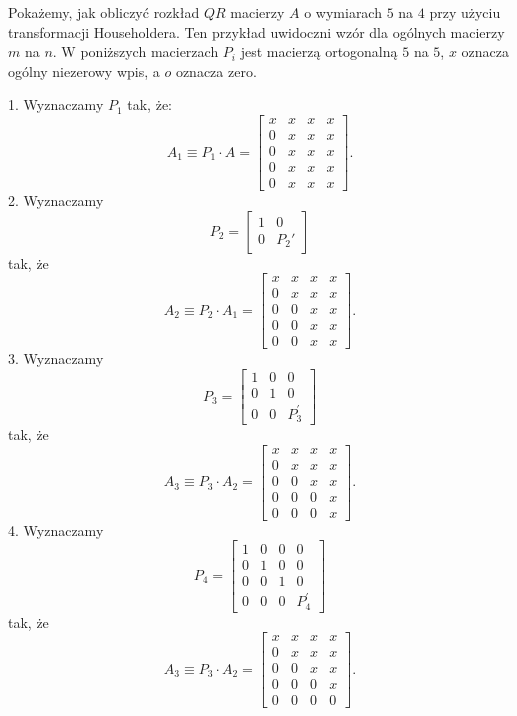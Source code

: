 \documentclass[12pt,a4paper]{report}
\newcommand{\mx}[1]{{#1}}
\begin{document}
\begin{example} Pokażemy, jak obliczyć rozkład $QR$ macierzy $A$ o wymiarach $5$ na $4$ przy użyciu transformacji Householdera. Ten przykład uwidoczni wzór dla ogólnych macierzy $m$ na $n$. W poniższych macierzach $P_{i}$ jest macierzą ortogonalną $5$ na $5$, $x$ oznacza ogólny niezerowy wpis, a $o$ oznacza zero.

1. Wyznaczamy $P_{1}$ tak, że:
$$
\mx{A_{1} \equiv {P_{1}\cdot A}}= \begin{bmatrix}
x & x & x & x \\
0 & x & x & x  \\
0 & x & x & x \\
0 & x & x & x  \\
0 & x & x & x 
\end{bmatrix}.
$$
2. Wyznaczamy 
$$
P_{2} = \left[ 
\begin{array}{c|c}
1 & 0 \\\hline
0 & P_2'
\end{array}
\right]
$$ 
tak, że
$$
\mx{A_{2} \equiv {P_{2}\cdot A_{1}}}= \begin{bmatrix}
x & x & x & x \\
0 & x & x & x  \\
0 & 0 & x & x \\
0 & 0 & x & x  \\
0 & 0 & x & x 
\end{bmatrix}.
$$
3. Wyznaczamy 
$$
P_{3} = \left[ 
\begin{array}{cc|c}
1 & 0 & 0 \\
0 & 1 & 0 \\\hline
0 & 0 & P_{3}^{'}
\end{array}
\right]
$$
tak, że
$$
\mx{A_{3} \equiv {P_{3}\cdot A_{2}}}= \begin{bmatrix}
x & x & x & x \\
0 & x & x & x  \\
0 & 0 & x & x \\
0 & 0 & 0 & x  \\
0 & 0 & 0 & x 
\end{bmatrix}.
$$
4. Wyznaczamy 
$$
P_{4} = \left[ 
\begin{array}{ccc|c}
1 & 0 & 0 & 0 \\
0 & 1 & 0 & 0 \\
0 & 0 & 1 & 0 \\\hline
0 & 0 & 0 & P_{4}^{'}
\end{array}
\right]
$$ 
tak, że
$$
\mx{A_{3} \equiv {P_{3}\cdot A_{2}}}= \begin{bmatrix}
x & x & x & x \\
0 & x & x & x  \\
0 & 0 & x & x \\
0 & 0 & 0 & x  \\
0 & 0 & 0 & 0 
\end{bmatrix}.
$$


\end{example}
\end{document}
